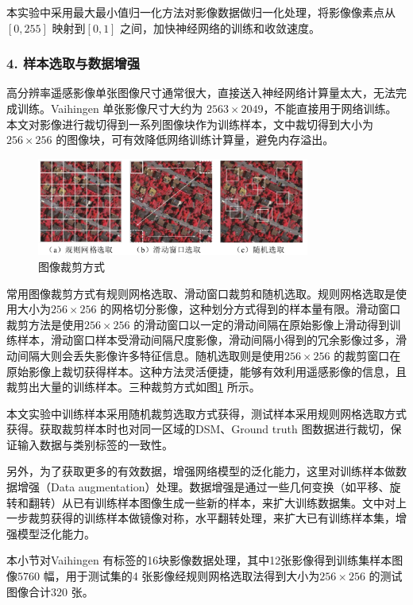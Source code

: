 本实验中采用最大最小值归一化方法对影像数据做归一化处理，将影像像素点从$[0,255]$ 映射到$[0,1]$ 之间，加快神经网络的训练和收敛速度。

\subsubsection*{4. 样本选取与数据增强}
高分辨率遥感影像单张图像尺寸通常很大，直接送入神经网络计算量太大，无法完成训练。Vaihingen 单张影像尺寸大约为 $2563 \times 2049$，不能直接用于网络训练。本文对影像进行裁切得到一系列图像块作为训练样本，文中裁切得到大小为$256 \times 256$ 的图像块，可有效降低网络训练计算量，避免内存溢出。

\begin{figure}[htb]
  \centering
  \includegraphics[width=0.8\textwidth]{figures/sample_data}
  \caption{图像裁剪方式}\label{fig:sample_data}
\end{figure}

常用图像裁剪方式有规则网格选取、滑动窗口裁剪和随机选取。规则网格选取是使用大小为$256 \times 256$ 的网格切分影像，这种划分方式得到的样本量有限。滑动窗口裁剪方法是使用$256 \times 256$ 的滑动窗口以一定的滑动间隔在原始影像上滑动得到训练样本，滑动窗口样本受滑动间隔尺度影像，滑动间隔小得到的冗余影像过多，滑动间隔大则会丢失影像许多特征信息。随机选取则是使用$256 \times 256$ 的裁剪窗口在原始影像上裁切获得样本。这种方法灵活便捷，能够有效利用遥感影像的信息，且裁剪出大量的训练样本。三种裁剪方式如图\ref{fig:sample_data} 所示。

本文实验中训练样本采用随机裁剪选取方式获得，测试样本采用规则网格选取方式获得。获取裁剪样本时也对同一区域的DSM、Ground truth 图数据进行裁切，保证输入数据与类别标签的一致性。

另外，为了获取更多的有效数据，增强网络模型的泛化能力，这里对训练样本做数据增强（Data augmentation）处理。数据增强是通过一些几何变换（如平移、旋转和翻转）从已有训练样本图像生成一些新的样本，来扩大训练数据集。文中对上一步裁剪获得的训练样本做镜像对称，水平翻转处理，来扩大已有训练样本集，增强模型泛化能力。

本小节对Vaihingen 有标签的16块影像数据处理，其中12张影像得到训练集样本图像$5760$ 幅，用于测试集的4 张影像经规则网格选取法得到大小为$256 \times 256$ 的测试图像合计$320$ 张。





